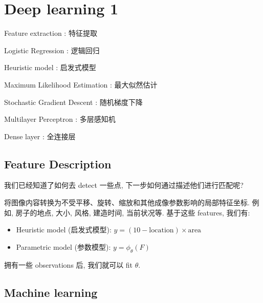 \chapter{Deep learning 1}
\begin{introduction}[keywords]
    \item Feature extraction : 特征提取
    \item Logistic Regression : 逻辑回归
    \item Heuristic model : 启发式模型
    \item Maximum Likelihood Estimation : 最大似然估计
    \item Stochastic Gradient Descent : 随机梯度下降
    \item Multilayer Perceptron : 多层感知机
    \item Dense layer : 全连接层
\end{introduction}
\section{Feature Description}

\begin{problem}
    我们已经知道了如何去 detect 一些点, 下一步如何通过描述他们进行匹配呢?
\end{problem}

    将图像内容转换为不受平移、旋转、缩放和其他成像参数影响的局部特征坐标. 例如, 房子的地点, 大小, 风格, 建造时间, 当前状况等. 基于这些 features, 我们有:
    \begin{itemize}
        \item Heuristic model (启发式模型): $y = (10-\text{location})\times \text{area}$
        \item Parametric model (参数模型): $y = \phi_\theta(F)$
    \end{itemize}
\begin{note}
拥有一些 observations 后, 我们就可以 fit $\theta$.
\end{note}

\section{Machine learning}

